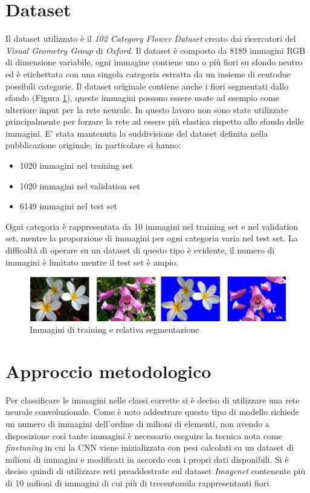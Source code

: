\section{Dataset}
Il dataset utilizzato è il \textit{102 Category Flower Dataset} \cite{Nilsback08} creato dai ricercatori del \textit{Visual Geometry Group} di \textit{Oxford}. Il dataset è composto da 8189 immagini RGB di dimensione variabile, ogni immagine contiene uno o più fiori su sfondo neutro ed è etichettata con una singola categoria estratta da un insieme di centodue possibili categorie. Il dataset originale contiene anche i fiori segmentati dallo sfondo (Figura \ref{fig_dataset}), queste immagini possono essere usate ad esempio come ulteriore input per la rete neurale. In questo lavoro non sono state utilizzate principalmente per forzare la rete ad essere più elastica rispetto allo sfondo delle immagini.
E' stata mantenuta la suddivisione del dataset definita nella pubblicazione originale, in particolare si hanno:
\begin{itemize}
\item 1020 immagini nel training set
\item 1020 immagini nel validation set
\item 6149 immagini nel test set
\end{itemize}
Ogni categoria è rappresentata da 10 immagini nel training set e nel validation set, mentre la proporzione di immagini per ogni categoria varia nel test set.
La difficoltà di operare su un dataset di questo tipo è evidente, il numero di immagini è limitato mentre il test set è ampio.
\begin{figure}[H]
\centering	
\includegraphics[width=1.0\textwidth]{images/dataset.png} 
\caption{Immagini di training e relativa segmentazione \cite{Nilsback08}}
\label{fig_dataset}
\vspace{-7mm}
\end{figure}


\section{Approccio metodologico}
Per classificare le immagini nelle classi corrette si è deciso di utilizzare una rete neurale convoluzionale. Come è noto addestrare questo tipo di modello richiede un numero di immagini dell'ordine di milioni di elementi, non avendo a disposizione così tante immagini è necessario eseguire la tecnica nota come \textit{finetuning} in cui la CNN viene inizializzata con pesi calcolati su un dataset di milioni di immagini e modificati in accordo con i propri dati disponibili.
Si è deciso quindi di utilizzare reti preaddestrate sul dataset \textit{Imagenet}   \cite{5206848} contenente più di 10 milioni di immagini di cui più di trecentomila rappresentanti fiori.
